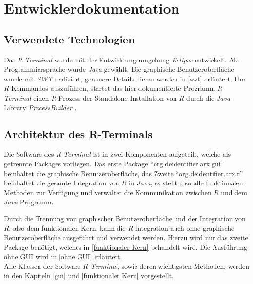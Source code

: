 \documentclass[a4paper, 12pt]{report} %
\begin{document}
\newpage

\chapter{Entwicklerdokumentation}

\section{Verwendete Technologien}

Das \textit{R-Terminal} wurde mit der Entwicklungsumgebung \textit{Eclipse} \cite{eclipse} entwickelt.
Als Programmiersprache wurde \textit{Java} \cite{java} gewählt. Die graphische Benutzeroberfläche wurde mit \textit{SWT} \cite{swt} realisiert, genauere Details hierzu werden in \ref{swt} erläutert.
Um \textit{R}-Kommandos auszuführen, startet das hier dokumentierte Programm \textit{R-Terminal} einen \textit{R}-Prozess der Standalone-Installation von \textit{R} durch die \textit{Java}-Library \textit{ProcessBuilder} \cite{processBuilder}.


\section{Architektur des R-Terminals}

Die Software des \textit{R-Terminal} ist in zwei Komponenten aufgeteilt, welche als getrennte Packages vorliegen. Das erste Package "`org.deidentifier.arx.gui"' beinhaltet die graphische Benutzeroberfläche, das Zweite "`org.deidentifier.arx.r"' beinhaltet die gesamte Integration von \textit{R} in \textit{Java}, es stellt also alle funktionalen Methoden zur Verfügung und verwaltet die Kommunikation zwischen \textit{R} und dem \textit{Java}-Programm.

Durch die Trennung von graphischer Benutzeroberfläche und der Integration von \textit{R}, also dem funktionalen Kern, kann die \textit{R}-Integration auch ohne graphische Benutzeroberfläche ausgeführt und verwendet werden. Hierzu wird nur das zweite Package benötigt, welches in \ref{funktionaler Kern} behandelt wird. Die Ausführung ohne GUI wird in \ref{ohne GUI} erläutert.\\

Alle Klassen der Software \textit{R-Terminal}, sowie deren wichtigsten Methoden, werden in den Kapiteln \ref{gui} und \ref{funktionaler Kern} vorgestellt.
\end{document}
